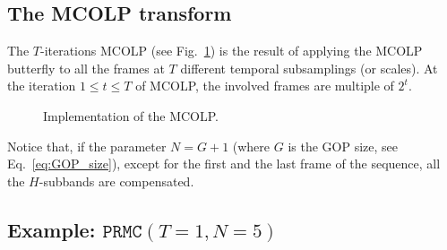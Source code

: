 



\subsection{The MCOLP transform}

The $T$-iterations MCOLP (see Fig.~\ref{fig:MCOLP}) is the result of
applying the MCOLP butterfly to all the frames at $T$ different
temporal subsamplings (or scales). At the iteration $1\leq t\leq T$ of
MCOLP, the involved frames are multiple of $2^t$.

\begin{figure}
  \centering
  
  \caption{Implementation of the MCOLP.}
  \label{fig:MCOLP}
\end{figure}

Notice that, if the parameter $N=G+1$ (where $G$ is the GOP size, see
Eq.~\ref{eq:GOP_size}), except for the first and the last frame of the
sequence, all the $H$-subbands are compensated.


\subsection{Example: $\mathtt{PRMC}(T=1, N=5)$}

